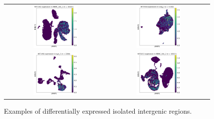 \begin{figure}[htbp]
\centering
\begin{tabular}{cc}
\includegraphics[width=0.45\textwidth]{images/isolatedDGEexamples/INT1492_PBMC_10x_3.png} &
\includegraphics[width=0.45\textwidth]{images/isolatedDGEexamples/INT1554_lung_2.png} \\
\includegraphics[width=0.45\textwidth]{images/isolatedDGEexamples/INT2456_eye_3.png} &
\includegraphics[width=0.45\textwidth]{images/isolatedDGEexamples/INT6013_PBMC_10x_2.png} \\
\end{tabular}
\caption{Examples of differentially expressed isolated intergenic regions.}
\label{fig:isolatedDGE}
\end{figure}

